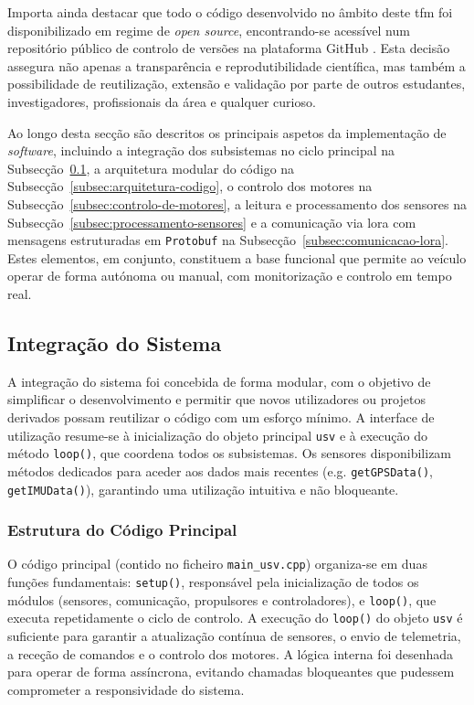Importa ainda destacar que todo o código desenvolvido no âmbito deste \gls{tfm} foi disponibilizado em regime de \emph{open source}, encontrando-se acessível num repositório público de controlo de versões na plataforma GitHub \cite{github-usv}. Esta decisão assegura não apenas a transparência e reprodutibilidade científica, mas também a possibilidade de reutilização, extensão e validação por parte de outros estudantes, investigadores, profissionais da área e qualquer curioso.

Ao longo desta secção são descritos os principais aspetos da implementação de \emph{software}, incluindo a integração dos subsistemas no ciclo principal na Subsecção~\ref{sec:integracao}, a arquitetura modular do código na Subsecção~\ref{subsec:arquitetura-codigo}, o controlo dos motores na Subsecção~\ref{subsec:controlo-de-motores}, a leitura e processamento dos sensores na Subsecção~\ref{subsec:processamento-sensores} e a comunicação via \gls{lora} com mensagens estruturadas em \texttt{Protobuf} na Subsecção~\ref{subsec:comunicacao-lora}. Estes elementos, em conjunto, constituem a base funcional que permite ao veículo operar de forma autónoma ou manual, com monitorização e controlo em tempo real.

\subsection{Integração do Sistema}
\label{sec:integracao}

A integração do sistema foi concebida de forma modular, com o objetivo de simplificar o desenvolvimento e permitir que novos utilizadores ou projetos derivados possam reutilizar o código com um esforço mínimo. A interface de utilização resume-se à inicialização do objeto principal \texttt{\gls{usv}} e à execução do método \texttt{loop()}, que coordena todos os subsistemas. Os sensores disponibilizam métodos dedicados para aceder aos dados mais recentes (e.g. \texttt{getGPSData()}, \texttt{getIMUData()}), garantindo uma utilização intuitiva e não bloqueante.  

\subsubsection{Estrutura do Código Principal}

O código principal (contido no ficheiro \texttt{main\_usv.cpp}) organiza-se em duas funções fundamentais: \texttt{setup()}, responsável pela inicialização de todos os módulos (sensores, comunicação, propulsores e controladores), e \texttt{loop()}, que executa repetidamente o ciclo de controlo. A execução do \texttt{loop()} do objeto \texttt{\gls{usv}} é suficiente para garantir a atualização contínua de sensores, o envio de telemetria, a receção de comandos e o controlo dos motores. A lógica interna foi desenhada para operar de forma assíncrona, evitando chamadas bloqueantes que pudessem comprometer a responsividade do sistema. 


